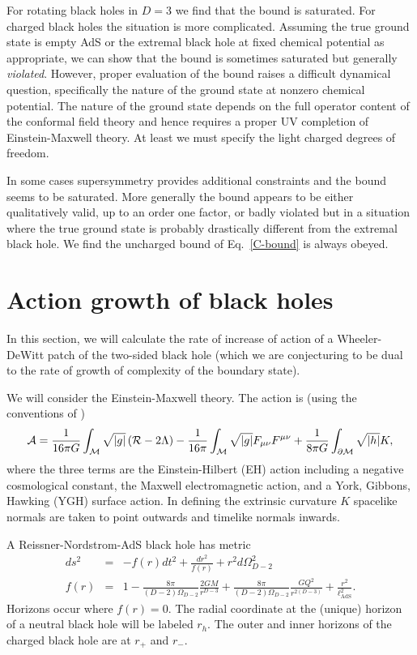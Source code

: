 \documentclass[12pt]{article}
\numberwithin{equation}{section}
\def\CA{{\cal A}}
\newcommand{\lads}{\ell_{\text{AdS}}}
\begin{document}
For rotating black holes in $D=3$ we find that the bound is saturated. For charged black holes the situation is more complicated. Assuming the true ground state is empty AdS or the extremal black hole at fixed chemical potential as appropriate, we can show that the bound is sometimes saturated but generally \textit{violated}. However, proper evaluation of the bound raises a difficult dynamical question, specifically the nature of the ground state at nonzero chemical potential. The nature of the ground state depends on the full operator content of the conformal field theory and hence requires a proper UV completion of Einstein-Maxwell theory. At least we must specify the light charged degrees of freedom.

In some cases supersymmetry provides additional constraints and the bound seems to be saturated. More generally the bound appears to be either qualitatively valid, up to an order one factor, or badly violated but in a situation where the true ground state is probably drastically different from the extremal black hole. We find the uncharged bound of Eq.~\ref{C-bound} is always obeyed.


\section{Action growth of black holes}
\label{sec:bh}

In this section, we will calculate the rate of increase of action of a Wheeler-DeWitt patch of the two-sided black hole (which we are conjecturing to be dual to the rate of growth of complexity of the boundary state).

We will consider the Einstein-Maxwell theory. The action is (using the conventions of \cite{Poisson})
 \begin{equation}
\CA =   \frac{1}{16 \pi G} \int_{\mathcal{M}}  \sqrt{|g|} \left( \mathcal{R} - 2 \Lambda  \right) - \frac{1}{16 \pi } \int_{\mathcal{M}}  \sqrt{|g|} F_{\mu \nu} F^{\mu \nu}  +  \frac{1}{8 \pi G} \int_{\partial \mathcal{M}} \sqrt{|h|} {K} , \label{eq:EinsteinHilbertActionForRealz}
\end{equation}
where the three terms are the Einstein-Hilbert (EH) action including a negative cosmological constant, the Maxwell electromagnetic action, and a York, Gibbons, Hawking (YGH) surface action.  In defining the extrinsic curvature $K$
 spacelike normals are taken to point outwards and timelike normals  inwards.

 A Reissner-Nordstrom-AdS black hole has metric
 \begin{eqnarray}
 ds^2 & = & - f(r)dt^2 + \frac{dr^2}{f(r)} + r^2 d \Omega_{D-2}^2 \\
f(r)  & = &   1 - \frac{8 \pi}{(D-2)\Omega_{D-2}} \frac{2 G M}{r^{D-3}} + \frac{8 \pi}{(D-2)\Omega_{D-2}} \frac{G Q^2 }{r^{2(D-3)}}+ \frac{r^2}{\lads^2} .
 \end{eqnarray}
Horizons occur where $f(r) =0.$ The radial coordinate at the (unique) horizon of a neutral black hole will be labeled
$r_h.$ The outer and inner horizons of the charged black hole are at $r_+$ and $r_-.$
\end{document}
